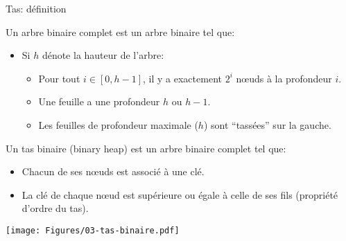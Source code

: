 \begin{frame}{Tas: définition}\label{sec:03tas}

Un arbre \alert{binaire complet} est un arbre binaire tel que:
\begin{itemize}
\item Si $h$ dénote la hauteur de l'arbre:
\begin{itemize}
\item Pour tout $i\in [0,h-1]$, il y a exactement $2^i$ n\oe uds à la profondeur $i$.
\item Une feuille a une profondeur $h$ ou $h-1$.
\item Les feuilles de profondeur maximale ($h$) sont ``tassées'' sur la gauche.
\end{itemize}
\end{itemize}
\medskip

Un \alert{tas binaire} (binary heap) est un arbre binaire complet tel que:
\begin{itemize}
\item Chacun de ses n\oe uds est associé à une clé.
\item La clé de chaque n\oe ud est supérieure ou égale à celle de ses
  fils (\alert{propriété d'ordre du tas}).
\end{itemize}

\centerline{\texttt{[image: Figures/03-tas-binaire.pdf]}}

\end{frame}

